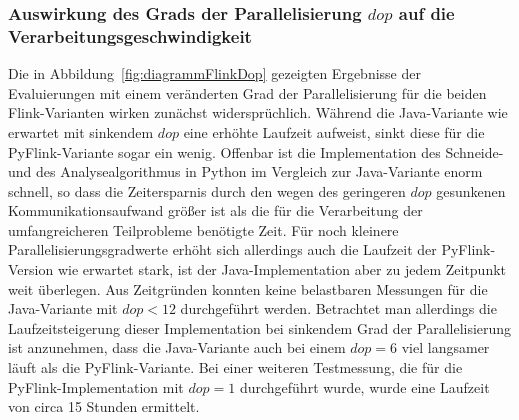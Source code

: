 \subsubsection{Auswirkung des Grads der Parallelisierung $dop$ auf die Verarbeitungsgeschwindigkeit}
Die in Abbildung~\ref{fig:diagrammFlinkDop} gezeigten Ergebnisse der Evaluierungen mit einem veränderten Grad der Parallelisierung für die beiden Flink-Varianten wirken zunächst widersprüchlich. Während die Java-Variante wie erwartet mit sinkendem $dop$ eine erhöhte Laufzeit aufweist, sinkt diese für die PyFlink-Variante sogar ein wenig. Offenbar ist die Implementation des Schneide- und des Analysealgorithmus in Python im Vergleich zur Java-Variante enorm schnell, so dass die Zeitersparnis durch den wegen des geringeren $dop$ gesunkenen Kommunikationsaufwand größer ist als die für die Verarbeitung der umfangreicheren Teilprobleme benötigte Zeit. Für noch kleinere Parallelisierungsgradwerte erhöht sich allerdings auch die Laufzeit der PyFlink-Version wie erwartet stark, ist der Java-Implementation aber zu jedem Zeitpunkt weit überlegen. Aus Zeitgründen konnten keine belastbaren Messungen für die Java-Variante mit $dop < 12$ durchgeführt werden. Betrachtet man allerdings die Laufzeitsteigerung dieser Implementation bei sinkendem Grad der Parallelisierung ist anzunehmen, dass die Java-Variante auch bei einem $dop = 6$ viel langsamer läuft als die PyFlink-Variante. Bei einer weiteren Testmessung, die für die PyFlink-Implementation mit $dop = 1$ durchgeführt wurde, wurde eine Laufzeit von circa 15 Stunden ermittelt.

